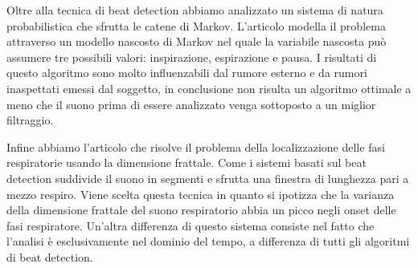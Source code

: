   Oltre alla tecnica di beat detection abbiamo analizzato un sistema di natura probabilistica che sfrutta le catene di Markov.
  L'articolo \cite{ARSAPD} modella il problema attraverso un modello nascosto di Markov nel quale la variabile nascosta pu\`o assumere tre possibili valori: inspirazione, espirazione e pausa.
  I risultati di questo algoritmo sono molto influenzabili dal rumore esterno e da rumori inaspettati emessi dal soggetto, in conclusione non risulta un algoritmo ottimale a meno che il suono prima di essere analizzato venga sottoposto a un miglior filtraggio.


  Infine abbiamo l'articolo \cite{RSDUVFD} che risolve il problema della localizzazione delle fasi respiratorie usando la dimensione frattale.
  Come i sistemi basati sul beat detection suddivide il suono in segmenti e sfrutta una finestra di lunghezza pari a mezzo respiro. Viene scelta questa tecnica in quanto si ipotizza che la varianza della dimensione frattale del suono respiratorio abbia un picco negli onset delle fasi respiratore.
  Un'altra differenza di questo sistema consiste nel fatto che l'analisi \`e esclusivamente nel dominio del tempo, a differenza di tutti gli algoritmi di beat detection.


